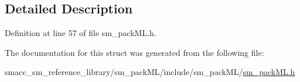 \subsection{Detailed Description}


Definition at line 57 of file sm\+\_\+pack\+M\+L.\+h.



The documentation for this struct was generated from the following file\+:\begin{DoxyCompactItemize}
\item 
smacc\+\_\+sm\+\_\+reference\+\_\+library/sm\+\_\+pack\+M\+L/include/sm\+\_\+pack\+M\+L/\hyperlink{sm__packML_8h}{sm\+\_\+pack\+M\+L.\+h}\end{DoxyCompactItemize}
